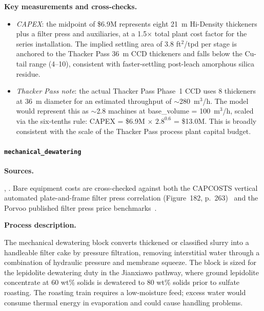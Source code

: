 \medskip
\noindent\textbf{Key measurements and cross-checks.}\quad

\begin{itemize}[noitemsep]
	\item \textit{CAPEX}: the midpoint of \$6.9M represents eight 21~m Hi-Density thickeners plus a filter press and auxiliaries, at a 1.5$\times$ total plant cost factor for the series installation. The implied settling area of 3.8 ft$^2$/tpd per stage is anchored to the Thacker Pass 36~m CCD thickeners and falls below the Cu-tail range (4--10), consistent with faster-settling post-leach amorphous silica residue.
	\item \textit{Thacker Pass note}: the actual Thacker Pass Phase~1 CCD uses 8 thickeners at 36~m diameter for an estimated throughput of $\sim$280~m$^3$/h. The model would represent this as $\sim$2.8 machines at base\_volume = 100~m$^3$/h, scaled via the six-tenths rule: CAPEX = \$6.9M $\times$ $2.8^{0.6}$ = \$13.0M. This is broadly consistent with the scale of the Thacker Pass process plant capital budget.
\end{itemize}

\clearpage
\paragraph{\texttt{mechanical\_dewatering}}\label{app:04-methods-blockdefs-dewater}

\medskip
\noindent\textbf{Sources.}\quad

\citet{mularCAPCOSTSHandbookEstimating1998}, \citet{porvooIndustrialFilterPress2025}. Bare equipment costs are cross-checked against both the CAPCOSTS vertical automated plate-and-frame filter press correlation (Figure~182, p.~263)~\citep{mularCAPCOSTSHandbookEstimating1998} and the Porvoo published filter press price benchmarks~\citep{porvooIndustrialFilterPress2025}.

\medskip
\noindent\textbf{Process description.}\quad

The mechanical dewatering block converts thickened or classified slurry into a handleable filter cake by pressure filtration, removing interstitial water through a combination of hydraulic pressure and membrane squeeze. The block is sized for the lepidolite dewatering duty in the Jianxiawo pathway, where ground lepidolite concentrate at 60 wt\% solids is dewatered to 80 wt\% solids prior to sulfate roasting. The roasting train requires a low-moisture feed; excess water would consume thermal energy in evaporation and could cause handling problems.

